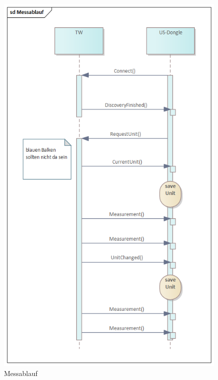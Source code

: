 \begin{figure}[H] 
	\centering
	\includegraphics[width=\textwidth]{figures/Messablauf.png}
	\caption{Messablauf}
\end{figure}

